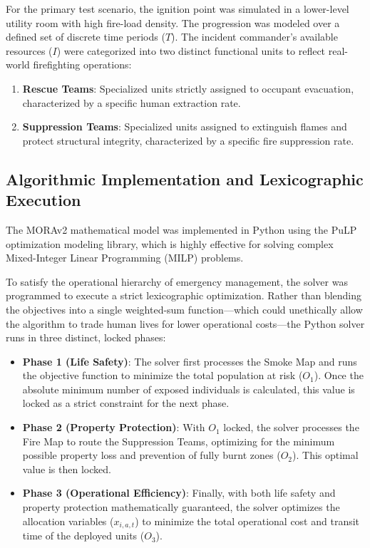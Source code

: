 For the primary test scenario, the ignition point was simulated in a lower-level utility room with high fire-load density. 
The progression was modeled over a defined set of discrete time periods ($T$). 
The incident commander's available resources ($I$) were categorized into two distinct functional units to reflect real-world firefighting operations:

\begin{enumerate}
    \item \textbf{Rescue Teams}: Specialized units strictly assigned to occupant evacuation, characterized by a specific human extraction rate.
    
    \item \textbf{Suppression Teams}: Specialized units assigned to extinguish flames and protect structural integrity, characterized by a specific fire suppression rate.
\end{enumerate}

\subsection{Algorithmic Implementation and Lexicographic Execution}
The MORAv2 mathematical model was implemented in Python using the PuLP optimization modeling library, which is highly effective for solving complex Mixed-Integer Linear Programming (MILP) problems.

To satisfy the operational hierarchy of emergency management, the solver was programmed to execute a strict lexicographic optimization. 
Rather than blending the objectives into a single weighted-sum function---which could unethically allow the algorithm to trade human lives for lower operational costs---the Python solver runs in three distinct, locked phases:

\begin{itemize}
    \item \textbf{Phase 1 (Life Safety)}: The solver first processes the Smoke Map and runs the objective function to minimize the total population at risk ($O_1$). Once the absolute minimum number of exposed individuals is calculated, this value is locked as a strict constraint for the next phase.
    
    \item \textbf{Phase 2 (Property Protection)}: With $O_1$ locked, the solver processes the Fire Map to route the Suppression Teams, optimizing for the minimum possible property loss and prevention of fully burnt zones ($O_2$). This optimal value is then locked.
    
    \item \textbf{Phase 3 (Operational Efficiency)}: Finally, with both life safety and property protection mathematically guaranteed, the solver optimizes the allocation variables ($x_{i,a,t}$) to minimize the total operational cost and transit time of the deployed units ($O_3$).
\end{itemize}

